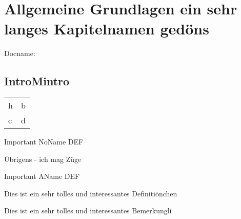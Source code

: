 \documentclass[Typ=Mitschrieb,Vorlesung=LAII]{Lilly}
\begin{document}
  
    \chapter{Allgemeine Grundlagen ein sehr langes Kapitelnamen gedöns} 
    Docname: \LILLYxDOCUMENTNAME

\section{IntroMintro}
        \begin{tabularx}{\linewidth}{lX}
            h & b \\
            c & d
        \end{tabularx}

        \begin{definition*}
            Important NoName DEF
        \end{definition*}

        \begin{satz}[Übrigens]
            Übrigens - ich mag Züge
        \end{satz}

        \begin{definition*}[Important]
            Important AName DEF
        \end{definition*}

        \begin{definition}
            Dies ist ein sehr tolles und interessantes Definitiönchen
        \end{definition}
        \begin{bemerkung}
            Dies ist ein sehr tolles und interessantes Bemerkungli
        \end{bemerkung}

\end{document}
